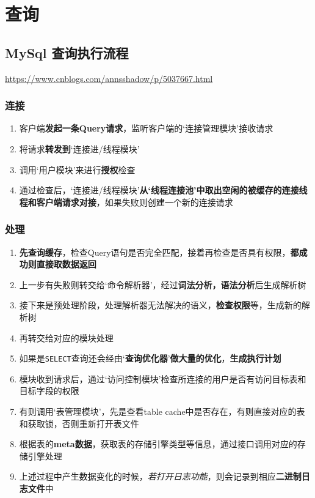 \documentclass[UTF8,a4paper,12pt]{ctexbook}
\begin{document}
			
\chapter{查询}
	\section{MySql 查询执行流程}
		\url{https://www.cnblogs.com/annsshadow/p/5037667.html}
			
		\subsection{连接}
			\begin{enumerate}
				\item 客户端\textbf{发起一条Query请求}，监听客户端的‘连接管理模块’接收请求
				\item 将请求\textbf{转发到}‘连接进/线程模块’
				\item 调用‘用户模块’来进行\textbf{授权}检查
				\item 通过检查后，‘连接进/线程模块’\textbf{从‘线程连接池’中取出空闲的被缓存的连接线程和客户端请求对接}，如果失败则创建一个新的连接请求
			\end{enumerate}
		
		\subsection{处理}
			\begin{enumerate}
				\item \textbf{先查询缓存}，检查Query语句是否完全匹配，接着再检查是否具有权限，\textbf{都成功则直接取数据返回}
				\item 上一步有失败则转交给‘命令解析器’，经过\textbf{词法分析，语法分析}后生成解析树
				\item 接下来是预处理阶段，处理解析器无法解决的语义，\textbf{检查权限}等，生成新的解析树
				\item 再转交给对应的模块处理
				\item 如果是\verb|SELECT|查询还会经由‘\textbf{查询优化器}’\textbf{做大量的优化}，\textbf{生成执行计划}
				\item 模块收到请求后，通过‘访问控制模块’检查所连接的用户是否有访问目标表和目标字段的权限
				\item 有则调用‘表管理模块’，先是查看table cache中是否存在，有则直接对应的表和获取锁，否则重新打开表文件
				\item 根据表的\textbf{meta数据}，获取表的存储引擎类型等信息，通过接口调用对应的存储引擎处理
				\item 上述过程中产生数据变化的时候，\textit{若打开日志功能}，则会记录到相应\textbf{二进制日志文件}中
			\end{enumerate}
		
\end{document}
